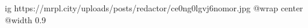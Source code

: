  
 
 
 
 

\ifcmt
  ig https://mrpl.city/uploads/posts/redactor/ce0ng0lgvj6nomor.jpg
  @wrap center
  @width 0.9
\fi
